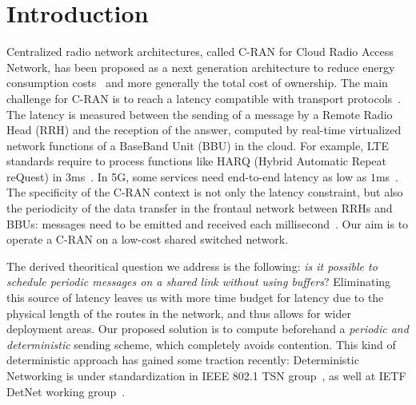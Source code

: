 \documentclass[a4paper,UKenglish,cleveref, autoref, thm-restate]{lipics-v2019}
\begin{document}
\section{Introduction}
Centralized radio network architectures, called C-RAN for Cloud Radio Access Network, has been proposed as a next generation architecture to reduce energy consumption costs~\cite{mobile2011c} and more generally the total cost of ownership. The main challenge for C-RAN is to reach a latency compatible with transport protocols~\cite{ieeep802}. The latency is measured between the sending of a message by a Remote Radio Head (RRH) and the reception of the answer, computed by real-time virtualized network functions of a BaseBand Unit (BBU) in the cloud. For example, LTE standards require to process functions like HARQ (Hybrid Automatic Repeat reQuest) in $3$ms~\cite{bouguen2012lte}. In 5G, some services need end-to-end latency as low as $1$ms~\cite{3gpp5g,boccardi2014five}. The specificity of the C-RAN context is not only the latency constraint, but also the periodicity of the data transfer in the frontaul network between RRHs and BBUs: messages need to be emitted and received each millisecond~\cite{bouguen2012lte}. Our aim is to operate a C-RAN on a low-cost shared switched network.


The derived theoritical question we address is the following: \emph{is it possible to schedule periodic messages on a shared link without using buffers}? Eliminating this source of latency leaves us with more time budget for latency due to the physical length of the routes in the network, and thus allows for wider deployment areas. Our proposed solution is to compute beforehand a \emph{periodic and deterministic} sending scheme, which completely avoids contention. This kind of deterministic approach has gained some traction recently: Deterministic Networking is under standardization in IEEE 802.1 TSN group~\cite{finn-detnet-architecture-08}, as well at IETF DetNet working group~\cite{ieee802}. 
\end{document}
